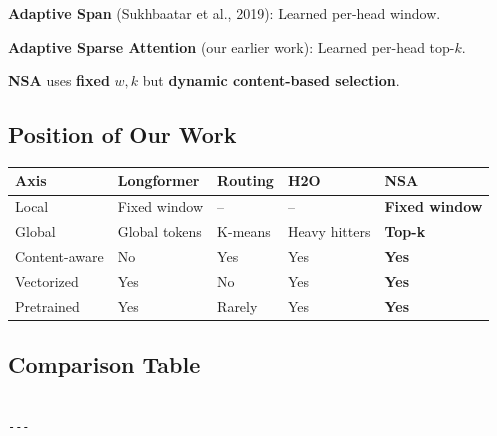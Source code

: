 \textbf{Adaptive Span} (Sukhbaatar et al., 2019): Learned per-head window.

\textbf{Adaptive Sparse Attention} (our earlier work): Learned per-head top-$k$.

\textbf{NSA} uses \textbf{fixed} $w, k$ but \textbf{dynamic content-based selection}.

\subsection{Position of Our Work}

\begin{table}[H]
\centering
\small
\begin{tabular}{lllll}
\toprule
\textbf{Axis} & \textbf{Longformer} & \textbf{Routing} & \textbf{H2O} & \textbf{NSA} \\
\midrule
Local & Fixed window & -- & -- & \textbf{Fixed window} \\
Global & Global tokens & K-means & Heavy hitters & \textbf{Top-k} \\
Content-aware & No & Yes & Yes & \textbf{Yes} \\
Vectorized & Yes & No & Yes & \textbf{Yes} \\
Pretrained & Yes & Rarely & Yes & \textbf{Yes} \\
\bottomrule
\end{tabular}
\end{table}

\subsection{Comparison Table}

\begin{lstlisting}

---
\end{lstlisting}